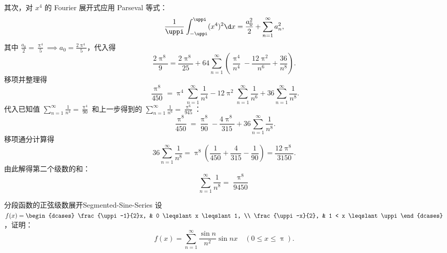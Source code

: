 \begin{solution}
    其次，对 $x^4$ 的 Fourier 展开式应用 Parseval 等式：
    \begin{equation}\label{eq:parseval-x4}
        \frac{1}{\uppi} \int_{-\uppi}^{\uppi} (x^4)^2 \d x = \frac{a_0^2}{2} + \sum_{n=1}^{\infty} a_n^2,
    \end{equation}
    其中 $\frac{a_0}{2} = \frac{\uppi^4}{5} \implies a_0 = \frac{2\uppi^4}{5}$，代入得
    \begin{equation}\label{eq:parseval-x4-calc}
        \frac{2\uppi^8}{9} = \frac{2\uppi^8}{25} + 64 \sum_{n=1}^{\infty} \left( \frac{\uppi^4}{n^4} - \frac{12\uppi^2}{n^6} + \frac{36}{n^8} \right).
    \end{equation}
    移项并整理得
    \begin{equation}\label{eq:parseval-x4-subs}
        \frac{\uppi^8}{450} = \uppi^4 \sum_{n=1}^{\infty} \frac{1}{n^4} - 12\uppi^2 \sum_{n=1}^{\infty} \frac{1}{n^6} + 36 \sum_{n=1}^{\infty} \frac{1}{n^8}.
    \end{equation}
    代入已知值 $\sum_{n=1}^{\infty} \frac{1}{n^4} = \frac{\uppi^4}{90}$ 和上一步得到的 $\sum_{n=1}^{\infty} \frac{1}{n^6} = \frac{\uppi^6}{945}$：
    \begin{equation}\label{eq:parseval-x4-final}
        \frac{\uppi^8}{450} = \frac{\uppi^8}{90} - \frac{4\uppi^8}{315} + 36 \sum_{n=1}^{\infty} \frac{1}{n^8}.
    \end{equation}
    移项通分计算得
    \begin{equation}\label{eq:final-sum-8}
        36 \sum_{n=1}^{\infty} \frac{1}{n^8} = \uppi^8 \left( \frac{1}{450} + \frac{4}{315} - \frac{1}{90} \right) = \frac{12\uppi^8}{3150}.
    \end{equation}
    由此解得第二个级数的和：
    \begin{equation}
        \boxed{\sum_{n=1}^{\infty} \frac{1}{n^8} = \frac{\uppi^8}{9450}}
    \end{equation}
\end{solution}

\begin{problem}{分段函数的正弦级数展开}{Segmented-Sine-Series}
    设 $f(x) = \begin{dcases} \frac{\uppi-1}{2}x, & 0 \leqslant x \leqslant 1, \\ \frac{\uppi-x}{2}, & 1 < x \leqslant \uppi \end{dcases}$，证明：
    \begin{equation*}
        f(x) = \sum_{n=1}^{\infty} \frac{\sin n}{n^2} \sin nx \quad (0 \leqslant x \leqslant \uppi).
    \end{equation*}
\end{problem}

